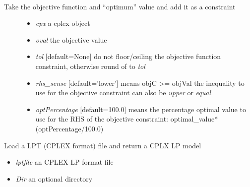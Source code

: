\documentclass[a4paper,11pt,english]{sphinxmanual}
\begin{document}

\begin{fulllineitems}
\label{modules_doc:cbmpy.CBCPLEX.cplx_func_SetObjectiveFunctionAsConstraint}~\begin{description}
\item[{Take the objective function and ``optimum'' value and add it as a constraint}] \leavevmode\begin{itemize}
\item {} 
\emph{cpx} a cplex object

\item {} 
\emph{oval} the objective value

\item {} 
\emph{tol}  {[}default=None{]} do not floor/ceiling the objective function constraint, otherwise round of to \emph{tol}

\item {} 
\emph{rhs\_sense} {[}default='lower'{]} means objC \textgreater{}= objVal the inequality to use for the objective constraint can also be \emph{upper} or \emph{equal}

\item {} 
\emph{optPercentage} {[}default=100.0{]} means the percentage optimal value to use for the RHS of the objective constraint: optimal\_value*(optPercentage/100.0)

\end{itemize}

\end{description}

\end{fulllineitems}


\begin{fulllineitems}
\label{modules_doc:cbmpy.CBCPLEX.cplx_getCPLEXModelFromLP}
Load a LPT (CPLEX format) file and return a CPLX LP model
\begin{itemize}
\item {} 
\emph{lptfile} an CPLEX LP format file

\item {} 
\emph{Dir} an optional directory

\end{itemize}

\end{fulllineitems}
\end{document}
